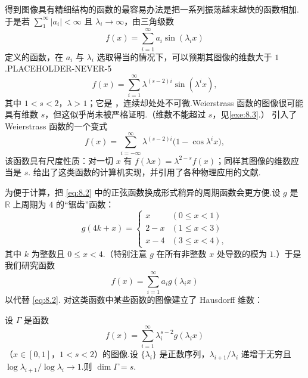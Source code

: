 得到图像具有精细结构的函数的最容易办法是把一系列振荡越来越快的函数相加.于是若 $\sum_{1}^{\infty}|a_i|<\infty$ 且 $\lambda_i\to\infty$，由三角级数
\begin{equation}\label{eq:8.2}
  f(x)=\sum_{i=1}^{\infty}a_i\sin(\lambda_i x)
\end{equation}
定义的函数，在 $a_i$ 与 $\lambda_i$ 选取得当的情况下，可以预期其图像的维数大于 $1$.PLACEHOLDER-NEVER-5
\begin{equation}\label{eq:8.3}
  f(x)=\sum_{i=1}^{\infty}\lambda^{(s-2)i}\sin(\lambda^{i}x),
\end{equation}
其中 $1<s<2$，$\lambda>1$；它是 ，连续却处处不可微.Weierstrass 函数的图像很可能具有维数 $s$，但这似乎尚未被严格证明.（维数不能超过 $s$，见\cref{exe:8.3}.）\textcite{mandelbrot1977} 引入了 Weierstrass 函数的一个变式
\[
  f(x)=\sum_{i=-\infty}^{\infty}\lambda^{(s-2)i}\bigl(1-\cos\lambda^{i}x\bigr),
\]
该函数具有尺度性质：对一切 $x$ 有 $f(\lambda x)=\lambda^{2-s}f(x)$；同样其图像的维数应当是 $s$.\textcite{berrylewis1980} 给出了这类函数的计算机实现，并引用了各种物理应用的文献.

为便于计算，把 \eqref{eq:8.2} 中的正弦函数换成形式稍异的周期函数会更方便.设 $g$ 是 $\mathbb{R}$ 上周期为 $4$ 的``锯齿''函数：
\[
  g(4k+x)=
  \begin{cases}
    x & (0\leq x<1)\\
    2-x & (1\leq x<3)\\
    x-4 & (3\leq x<4),
  \end{cases}
\]
其中 $k$ 为整数且 $0\leq x<4$.（特别注意 $g$ 在所有非整数 $x$ 处导数的模为 $1$.）于是我们研究函数
\begin{equation}\label{eq:8.4}
  f(x)=\sum_{i=1}^{\infty}a_i g(\lambda_i x)
\end{equation}
以代替 \eqref{eq:8.2}.\textcite{besicovitchursell1937} 对这类函数中某些函数的图像建立了 Hausdorff 维数：

\begin{theorem}\label{thm:8.2}
设 $\Gamma$ 是函数
\begin{equation}\label{eq:8.5}
  f(x)=\sum_{i=1}^{\infty}\lambda_i^{s-2}g(\lambda_i x)
\end{equation}
（$x\in[0,1]$，$1<s<2$）的图像.设 $\{\lambda_i\}$ 是正数序列，$\lambda_{i+1}/\lambda_i$ 递增于无穷且 $\log\lambda_{i+1}/\log\lambda_i\to 1$.则 $\dim\Gamma=s$.
\end{theorem}

